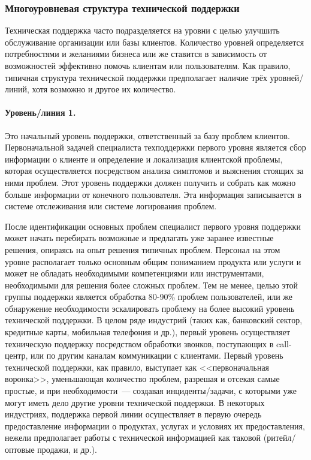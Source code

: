 \documentclass{../../text-style}
\begin{document}
\subsubsection{Многоуровневая структура технической поддержки}

Техническая поддержка часто подразделяется на уровни с целью улучшить обслуживание организации или базы клиентов. Количество уровней определяется потребностями и желаниями бизнеса или же ставится в зависимость от возможностей эффективно помочь клиентам или пользователям. Как правило, типичная структура технической поддержки предполагает наличие трёх уровней/линий, хотя возможно и другое их количество.

\paragraph{Уровень/линия 1.} Это начальный уровень поддержки, ответственный за базу проблем клиентов. Первоначальной задачей специалиста техподдержки первого уровня является сбор информации о клиенте и определение и локализация клиентской проблемы, которая осуществляется посредством анализа симптомов и выяснения стоящих за ними проблем. Этот уровень поддержки должен получить и собрать как можно больше информации от конечного пользователя. Эта информация записывается в системе отслеживания или системе логирования проблем.

После идентификации основных проблем специалист первого уровня поддержки может начать перебирать возможные и предлагать уже заранее известные решения, опираясь на опыт решения типичных проблем. Персонал на этом уровне располагает только основным общим пониманием продукта или услуги и может не обладать необходимыми компетенциями или инструментами, необходимыми для решения более сложных проблем. Тем не менее, целью этой группы поддержки является обработка 80-90\% проблем пользователей, или же обнаружение необходимости эскалировать проблему на более высокий уровень технической поддержки. В целом ряде индустрий (таких как, банковский сектор, кредитные карты, мобильная телефония и др.), первый уровень осуществляет техническую поддержку посредством обработки звонков, поступающих в call-центр, или по другим каналам коммуникации с клиентами. Первый уровень технической поддержки, как правило, выступает как <<первоначальная воронка>>, уменьшающая количество проблем, разрешая и отсекая самые простые, и при необходимости~--- создавая инциденты/задачи, с которыми уже могут иметь дело другие уровни технической поддержки. В некоторых индустриях, поддержка первой линии осуществляет в первую очередь предоставление информации о продуктах, услугах и условиях их предоставления, нежели предполагает работы с технической информацией как таковой (ритейл/оптовые продажи, и др.).
\end{document}
